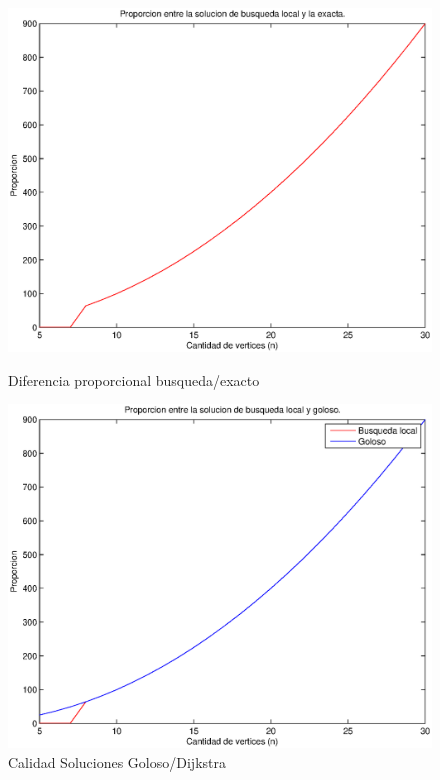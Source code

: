\begin{figure}[H]
  \begin{minipage}{0.5\linewidth}
    \includegraphics[width=\linewidth]{graficos/busq_local_proporcion.eps}
    \caption{Diferencia proporcional busqueda/exacto}\label{fig:busq-local-proporcion}
  \end{minipage}
  \hfill
  \begin{minipage}{0.5\linewidth}
    \includegraphics[width=\linewidth]{graficos/busq_local_proporcion_comparacion.eps}
    \caption{Calidad Soluciones Goloso/Dijkstra}\label{fig:busq-local-proporcion-comparacion}
  \end{minipage}
\end{figure}

